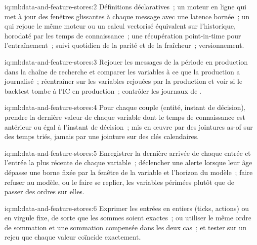 \begin{solution}{iq:ml:data-and-feature-stores:2}
Définitions déclaratives~; un moteur en ligne qui met à jour des fenêtres glissantes à chaque message avec une latence bornée~; un 
qui rejoue le même moteur ou un calcul vectorisé équivalent sur l'historique, horodaté par les temps de connaissance~; une récupération
point-in-time pour l'entraînement~; suivi quotidien de la parité et de la fraîcheur~; versionnement.
\end{solution}

\begin{solution}{iq:ml:data-and-feature-stores:3}
Rejouer les messages de la période en production dans la chaîne de recherche et comparer les variables à ce que la production a journalisé~; réentraîner sur
les variables rejouées par la production et voir si le backtest tombe à l'IC en production~; contrôler les journaux de .
\end{solution}

\begin{solution}{iq:ml:data-and-feature-stores:4}
Pour chaque couple (entité, instant de décision), prendre la dernière valeur de chaque variable dont le temps de connaissance est antérieur ou égal à l'instant de décision~; mis en œuvre
par des jointures as-of sur des temps triés, jamais par une jointure sur des clés calendaires.
\end{solution}

\begin{solution}{iq:ml:data-and-feature-stores:5}
Enregistrer la dernière arrivée de chaque entrée et l'entrée la plus récente de chaque variable~; déclencher une alerte lorsque leur âge dépasse une borne
fixée par la fenêtre de la variable et l'horizon du modèle~; faire refuser au modèle, ou le faire se replier, les variables périmées plutôt que de passer des ordres sur elles.
\end{solution}

\begin{solution}{iq:ml:data-and-feature-stores:6}
Exprimer les entrées en entiers (ticks, actions) ou en virgule fixe, de sorte que les sommes soient exactes~; ou utiliser le même ordre de sommation et une sommation
compensée dans les deux cas~; et tester sur un rejeu que chaque valeur coïncide exactement.
\end{solution}
